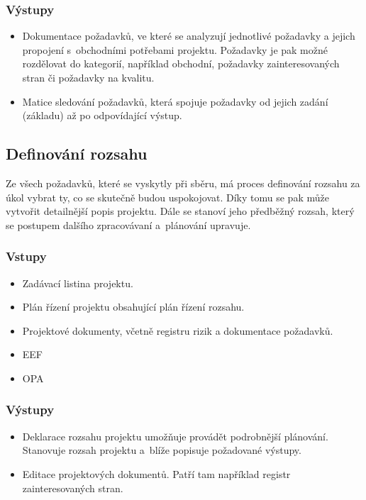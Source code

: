 \subsubsection*{Výstupy}
\begin{itemize}
    \item Dokumentace požadavků, ve které se analyzují jednotlivé požadavky a jejich propojení s~obchodními potřebami projektu. Požadavky je pak možné rozdělovat do kategorií, například obchodní, požadavky zainteresovaných stran či požadavky na kvalitu.
    \item Matice sledování požadavků, která spojuje požadavky od jejich zadání (základu) až po odpovídající výstup.
\end{itemize}

\subsection*{Definování rozsahu}

Ze všech požadavků, které se vyskytly při sběru, má proces definování rozsahu za úkol vybrat ty, co se skutečně budou uspokojovat. Díky tomu se pak může vytvořit detailnější popis projektu. Dále se stanoví jeho předběžný rozsah, který se postupem dalšího zpracovávaní a~plánování upravuje.

\subsubsection*{Vstupy}
\begin{itemize}
    \item Zadávací listina projektu.
    \item Plán řízení projektu obsahující plán řízení rozsahu.
    \item Projektové dokumenty, včetně registru rizik a dokumentace požadavků.
    \item EEF
    \item OPA
\end{itemize}
\subsubsection*{Výstupy}
\begin{itemize}
    \item Deklarace rozsahu projektu umožňuje provádět podrobnější plánování. Stanovuje rozsah projektu a~blíže popisuje požadované výstupy. 
    \item Editace projektových dokumentů. Patří tam například registr zainteresovaných stran.
\end{itemize}

